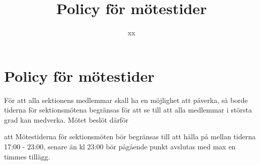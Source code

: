 \documentclass{dsekkallelse}
\title{Policy för mötestider}
\author{xx}
\begin{document}
\section{Policy för mötestider}

För att alla sektionens medlemmar skall ha en möjlighet att påverka, så borde tiderna för sektionsmötena begränsas för att se till att alla medlemmar i största grad kan medverka.
Mötet beslöt därför
\begin{attlista}
	\item att Mötestiderna för sektionsmöten bör begränsas till att hålla på mellan tiderna 17:00 - 23:00,
senare än kl 23:00 bör pågående punkt avslutas med max en timmes tillägg.
\end{attlista}
\end{document}
